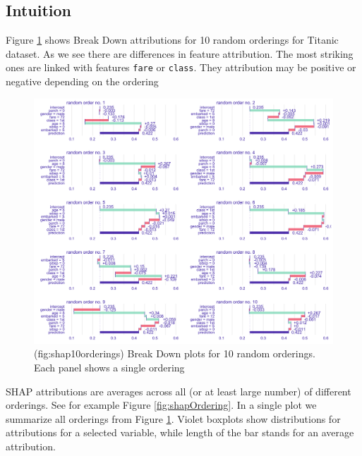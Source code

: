 \documentclass[12pt,]{krantz}
\theoremstyle{definition}
\theoremstyle{definition}
\theoremstyle{definition}
\theoremstyle{remark}
\begin{document}
\hypertarget{intuition-2}{%
\subsection{Intuition}\label{intuition-2}}

Figure \ref{fig:shap10orderings} shows Break Down attributions for 10
random orderings for Titanic dataset. As we see there are differences in
feature attribution. The most striking ones are linked with features
\texttt{fare} or \texttt{class}. They attribution may be positive or
negative depending on the ordering

\begin{figure}

{\centering \includegraphics[width=1\linewidth]{figure/shap_10_replicates} 

}

\caption{(fig:shap10orderings) Break Down plots for 10 random orderings. Each panel shows a single ordering}\label{fig:shap10orderings}
\end{figure}

SHAP attributions are averages across all (or at least large number) of
different orderings. See for example Figure \ref{fig:shapOrdering}. In a
single plot we summarize all orderings from Figure
\ref{fig:shap10orderings}. Violet boxplots show distributions for
attributions for a selected variable, while length of the bar stands for
an average attribution.
\end{document}
